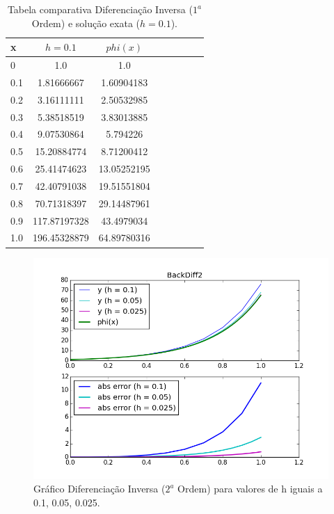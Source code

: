 \documentclass[a4paper]{article}
\begin{document}
\begin{table}[!h]
\centering
\begin{tabular}{l*{6}{c}r}
x               & $h=0.1$ & $phi(x)$ \\
\hline
0                   & 1.0 & 1.0          \\
0.1                 & 1.81666667 & 1.60904183   \\
0.2                 & 3.16111111 & 2.50532985   \\
0.3                 & 5.38518519 & 3.83013885   \\
0.4                 & 9.07530864 & 5.794226     \\
0.5                 & 15.20884774 & 8.71200412   \\
0.6                 & 25.41474623 & 13.05252195  \\
0.7                 & 42.40791038 & 19.51551804  \\
0.8                 & 70.71318397 & 29.14487961  \\
0.9                 & 117.87197328 & 43.4979034   \\
1.0                 & 196.45328879 & 64.89780316  \\
\end{tabular}
\caption{\label{tab:backdiff1}Tabela comparativa Diferenciação Inversa ($1^a$ Ordem) e solução exata ($h=0.1$).}
\end{table}

\begin{figure}[b]
\centering
\includegraphics[width=1.0\textwidth]{plots/BackDiff2.png}
\caption{\label{fig:backdiff2}Gráfico Diferenciação Inversa ($2^a$ Ordem) para valores de h iguais a 0.1, 0.05, 0.025.}
\end{figure}
\end{document}
